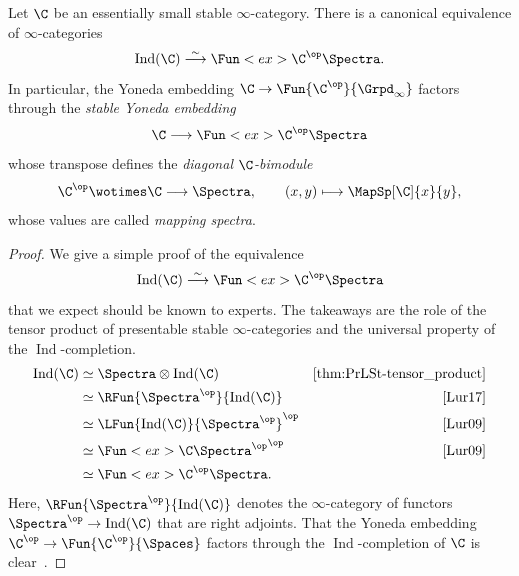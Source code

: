 \documentclass[a4paper]{amsart}
\begin{document}
\begin{defprop}
  Let $\C$ be an essentially small stable $\infty$-category. There is a
  canonical equivalence of $\infty$-categories
  \[
    \operatorname{Ind}(\C)\stackrel{\sim}{\longrightarrow}\Fun<ex>{\C^\op}{\Spectra}.
  \]
  In particular, the Yoneda embedding $\C\to\Fun{\C^\op}{\Grpd_\infty}$
  factors through the \emph{stable Yoneda embedding}
  \[
    \C\longrightarrow\Fun<ex>{\C^\op}{\Spectra}
  \]
  whose transpose defines the \emph{diagonal $\C$-bimodule}
  \[
    \C^\op\wotimes\C\longrightarrow\Spectra,\qquad (x,y)\longmapsto\MapSp[\C]{x}{y},
  \]
  whose values are called \emph{mapping spectra}.
\end{defprop}
\begin{proof}
  We give a simple proof of the equivalence
 \[
   \operatorname{Ind}(\C)\stackrel{\sim}{\longrightarrow}\Fun<ex>{\C^\op}{\Spectra}
 \]
 that we expect should be known to experts. The takeaways are the role of the tensor
 product of presentable stable $\infty$-categories and the universal property of
 the $\operatorname{Ind}$-completion.
 \begin{align*}
   \operatorname{Ind}(\C)&\simeq\Spectra\otimes\operatorname{Ind}(\C)&\text{\Cref{thm:PrLSt-tensor_product}}\\
                         &\simeq\RFun{\Spectra^\op}{\operatorname{Ind}(\C)}&\text{\cite[Proposition~4.8.1.17]{Lur17}}\\
                         &\simeq\LFun{\operatorname{Ind}(\C)}{\Spectra^\op}^\op&\text{\cite[Proposition~5.2.6.2]{Lur09}}\\
                         &\simeq\Fun<ex>{\C}{\Spectra^\op}^\op&\text{\cite[Proposition~5.3.5.10]{Lur09}}\\
                         &\simeq\Fun<ex>{\C^\op}{\Spectra}.
 \end{align*}
 Here, $\RFun{\Spectra^\op}{\operatorname{Ind}(\C)}$ denotes the
 $\infty$-category of functors $\Spectra^\op\to\operatorname{Ind}(\C)$ that are
 right adjoints. That the Yoneda embedding $\C^\op\to\Fun{\C^\op}{\Spaces}$
 factors through the $\operatorname{Ind}$-completion of $\C$ is
 clear~\cite[Remark~5.3.5.2]{Lur09}.
\end{proof}
\end{document}
